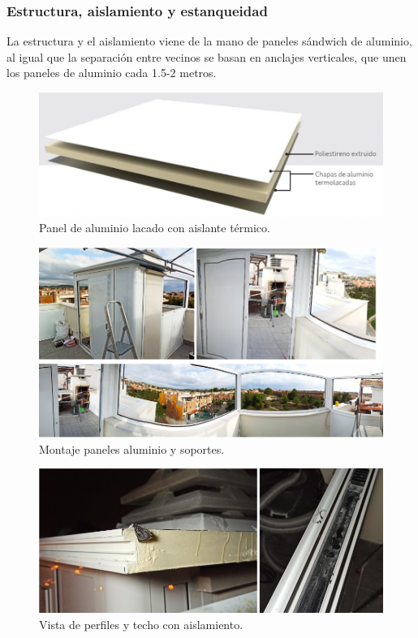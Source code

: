 \subsubsection{Estructura, aislamiento y estanqueidad} \label{S:estructura_aislamiento}
La estructura y el aislamiento viene de la mano de paneles sándwich de aluminio, al igual que la separación entre vecinos se basan en anclajes verticales, que unen los paneles de aluminio cada 1.5-2 metros. 
\begin{figure}[!h]
\begin{center}
\includegraphics[width=1\textwidth]{./figuras/panel_aluminio.jpg}
\caption{Panel de aluminio lacado con aislante térmico.}
\label{F:panel_aluminio}
\end{center}
\end{figure}
\begin{figure}[!h]
\centering
\includegraphics[width=1\textwidth]{./figuras/montaje_aluminio.jpg}
\caption{Montaje paneles aluminio y soportes.}
\label{F:montaje_aluminio}
\end{figure}
\begin{figure}[!h]
\centering
\includegraphics[width=1\textwidth]{./figuras/perfil_aislamiento.jpg}
\caption{Vista de perfiles y techo con aislamiento.}
\label{F:perfil_aislamiento}

\end{figure}
